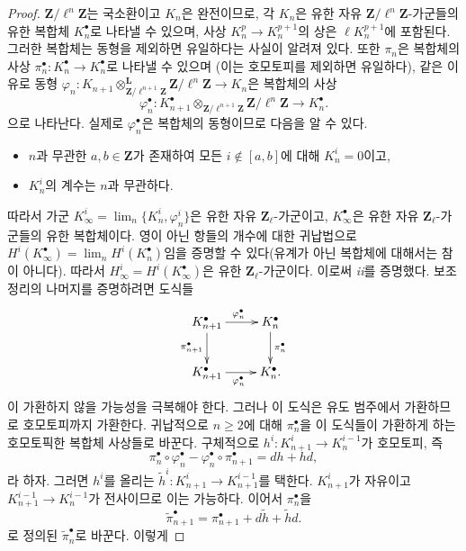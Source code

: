 \begin{proof}
$\mathbf{Z}/\ell^n\mathbf{Z}$는 국소환이고 $K_n$은 완전이므로, 각
$K_n$은 유한 자유 $\mathbf{Z}/\ell^n \mathbf{Z}$-가군들의 유한
복합체 $K_n^\bullet$로 나타낼 수 있으며, 사상
$K_n^p \to K_n^{p+1}$의 상은 $\ell K_n^{p+1}$에 포함된다. 그러한
복합체는 동형을 제외하면 유일하다는 사실이 알려져 있다. 또한
$\pi_n$은 복합체의 사상
$\pi_n^\bullet : K_n^\bullet\to K_n^\bullet$로 나타낼 수 있으며
(이는 호모토피를 제외하면 유일하다), 같은 이유로 동형
$\varphi_n : K_{n+1} \otimes_{\mathbf{Z}/\ell^{n+1}\mathbf{Z}}^{\mathbf{L}}
\mathbf{Z}/\ell^n\mathbf{Z}\to K_n$은 복합체의 사상
$$
\varphi_n^\bullet :
K_{n+1}^\bullet
\otimes_{\mathbf{Z}/\ell^{n+1}\mathbf{Z}}
\mathbf{Z}/\ell^n\mathbf{Z} \to K_n^\bullet.
$$
으로 나타난다. 실제로 $\varphi_n^\bullet$은 복합체의 동형이므로
다음을 알 수 있다.
\begin{itemize}
\item
$n$과 무관한 $a, b\in \mathbf{Z}$가 존재하여 모든
$i\notin[a, b]$에 대해 $K_n^i = 0$이고,
\item
$K_n^i$의 계수는 $n$과 무관하다.
\end{itemize}
따라서 가군 $K_\infty^i = \lim_n \{K_n^i, \varphi_n^i\}$은 유한
자유 $\mathbf{Z}_\ell$-가군이고, $K_\infty^\bullet$은 유한 자유
$\mathbf{Z}_\ell$-가군들의 유한 복합체이다. 영이 아닌 항들의
개수에 대한 귀납법으로
$H^i\left(K_\infty^\bullet\right) = \lim_n
H^i\left(K_n^\bullet\right)$임을 증명할 수 있다(유계가 아닌
복합체에 대해서는 참이 아니다). 따라서
$H_\infty^i = H^i\left(K_\infty^\bullet\right)$은 유한
$\mathbf{Z}_\ell$-가군이다. 이로써 {\it ii}를 증명했다.
보조정리의 나머지를 증명하려면 도식들
$$
\xymatrix{
{K_{n+1}^\bullet} \ar[d]_{\pi_{n+1}^\bullet} \ar[r]^{\varphi_n^\bullet} &
{K_n^\bullet} \ar[d]^{\pi_n^\bullet} \\
{K_{n+1}^\bullet} \ar[r]_{\varphi_n^\bullet} & {K_n^\bullet.}
}
$$
이 가환하지 않을 가능성을 극복해야 한다. 그러나 이 도식은 유도
범주에서 가환하므로 호모토피까지 가환한다. 귀납적으로
$n\geq 2$에 대해 $\pi_n^\bullet$을 이 도식들이 가환하게 하는
호모토픽한 복합체 사상들로 바꾼다. 구체적으로
$h^i : K_{n+1}^i \to K_n^{i-1}$가 호모토피, 즉
$$
\pi_n^\bullet \circ \varphi_n^\bullet -
\varphi_n^\bullet \circ \pi_{n + 1}^\bullet = dh + hd,
$$
라 하자. 그러면 $h^i$를 올리는
$\tilde h^i : K_{n+1}^i\to K_{n+1}^{i-1}$를 택한다.
$K_{n+1}^i$가 자유이고 $K_{n+1}^{i-1}\to K_n^{i-1}$가 전사이므로
이는 가능하다. 이어서 $\pi_n^\bullet$을
$$
\tilde\pi_{n+1}^\bullet = \pi_{n+1}^\bullet + d\tilde h+\tilde hd.
$$
로 정의된 $\tilde\pi_n^\bullet$로 바꾼다. 이렇게

\end{proof}

